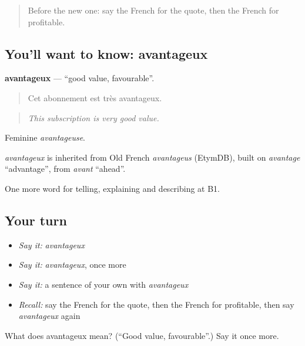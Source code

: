 \label{lesson:FR-C393-avantageux}



\begin{quote}
Before the new one: say the French for the quote, then the French for profitable.
\end{quote}

\subsection*{You'll want to know: avantageux}
\textbf{avantageux} — \textquotedblleft{}good value, favourable\textquotedblright{}.

\begin{quote}
Cet abonnement est très avantageux.
\end{quote}

\begin{quote}
\emph{This subscription is very good value.}
\end{quote}

Feminine \emph{avantageuse}.

\begin{cousinweb}
\emph{avantageux} is inherited from Old French \emph{avantageus} (EtymDB), built on \emph{avantage} \textquotedblleft{}advantage\textquotedblright{}, from \emph{avant} \textquotedblleft{}ahead\textquotedblright{}.
\end{cousinweb}

\begin{grammarlens}[title={What you've built}]
One more word for telling, explaining and describing at B1.
\end{grammarlens}

\subsection*{Your turn}
\begin{itemize}
\raggedright
  \item \emph{Say it:} \emph{avantageux}
  \item \emph{Say it:} \emph{avantageux}, once more
  \item \emph{Say it:} a sentence of your own with \emph{avantageux}
  \item \emph{Recall:} say the French for the quote, then the French for profitable, then say \emph{avantageux} again
\end{itemize}

\begin{tcolorbox}[breakable,colback=teal!4,colframe=teal!35!black,title={Before you move on}]
What does avantageux mean? (\textquotedblleft{}Good value, favourable\textquotedblright{}.) Say it once more.
\end{tcolorbox}
